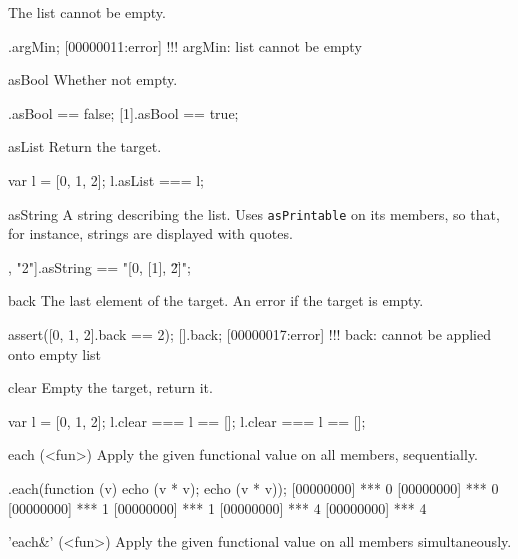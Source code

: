 \begin{urbiscriptapi}
The list cannot be empty.

\begin{urbiscript}
[].argMin;
[00000011:error] !!! argMin: list cannot be empty
\end{urbiscript}


\item[asBool]
  Whether not empty.
\begin{urbiassert}
[].asBool == false;
[1].asBool == true;
\end{urbiassert}


\item[asList]
  Return the target.

\begin{urbiassert}
var l = [0, 1, 2];
l.asList === l;
\end{urbiassert}


\item[asString]
  A string describing the list.  Uses \lstinline|asPrintable| on its
  members, so that, for instance, strings are displayed with quotes.

\begin{urbiassert}
[0, [1], "2"].asString == "[0, [1], \"2\"]";
\end{urbiassert}


\item[back]
  The last element of the target. An error if the target is empty.

\begin{urbiscript}
assert([0, 1, 2].back == 2);
[].back;
[00000017:error] !!! back: cannot be applied onto empty list
\end{urbiscript}


\item[clear]
  Empty the target, return it.

\begin{urbiassert}
var l = [0, 1, 2];
l.clear === l == [];
l.clear === l == [];
\end{urbiassert}


\item[each](<fun>)%
  Apply the given functional value  on all members, sequentially.

\begin{urbiscript}
[0, 1, 2].each(function (v) {echo (v * v); echo (v * v)});
[00000000] *** 0
[00000000] *** 0
[00000000] *** 1
[00000000] *** 1
[00000000] *** 4
[00000000] *** 4
\end{urbiscript}


\item['each&'](<fun>)%
Apply the given functional value on all members simultaneously.


\end{urbiscriptapi}
